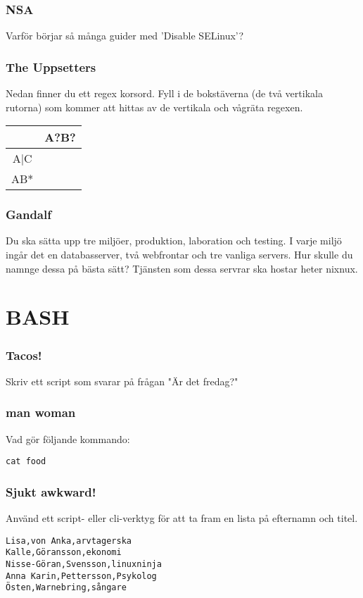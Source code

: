 \documentclass[a4paper]{report}
\begin{document}
\subsubsection{NSA}
Varför börjar så många guider med 'Disable SELinux'?

\subsubsection{The Uppsetters}
Nedan finner du ett regex korsord. Fyll i de bokstäverna (de två vertikala rutorna) som kommer att hittas av de vertikala och vågräta regexen.
\newline
\begin{tabular}{| c | c |}
\hline
& A?B? \\ \hline
A|C & \\ \hline
AB* & \\ \hline
\end{tabular}

\subsubsection{Gandalf}
Du ska sätta upp tre miljöer, produktion, laboration och testing. I varje miljö ingår det en databasserver, två webfrontar och tre vanliga servers. 
Hur skulle du namnge dessa på bästa sätt?
Tjänsten som dessa servrar ska hostar heter nixnux.

\section{BASH}

\subsubsection{Tacos!}
Skriv ett script som svarar på frågan "Är det fredag?"

\subsubsection{man woman}
Vad gör följande kommando:
\begin{verbatim}
cat food
\end{verbatim}

\subsubsection{Sjukt awkward!}
Använd ett script- eller cli-verktyg för att ta fram en lista på efternamn och titel.
\begin{verbatim}
Lisa,von Anka,arvtagerska
Kalle,Göransson,ekonomi
Nisse-Göran,Svensson,linuxninja
Anna Karin,Pettersson,Psykolog
Östen,Warnebring,sångare
\end{verbatim}
\end{document}

